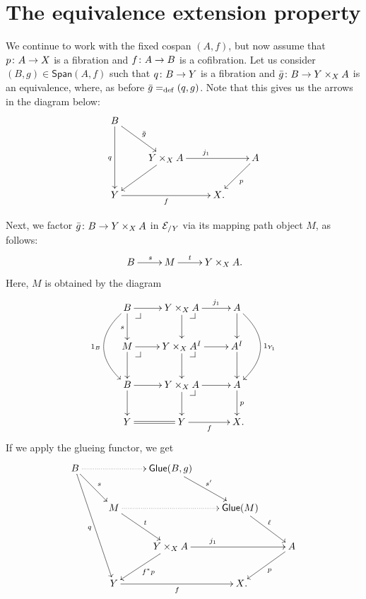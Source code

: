 \documentclass[reqno,a4paper,oneside]{amsart}
\begin{document}
\section{The equivalence extension property} 

We continue to work with the fixed cospan $(A, f)$, but now assume that $p \co A \to X$ is a fibration and 
$f \co A \to B$ is a cofibration. Let us consider $(B, g) \in \mathsf{Span}(A, f)$ such
that $q \co B \to Y$ is a fibration and $\bar{g} \co B \to Y \times_X A$ is an equivalence, where, as before $\bar{g} \defeq (q,g)$. Note that this gives us the arrows in the diagram below: 
\[
\xymatrix{
  B
  \ar[dr]^{\bar{g}}
  \ar[dd]_{q}
&&
&\\&
  Y \times_X A 
  \ar[rr]^(.45){j_1}
  \ar[dl]
&&
  A
  \ar[dl]^{p}
\\
  Y
  \ar[rr]_f
&&
  X \rlap{.} 
&
}
\]

Next, we factor $\bar{g} \co  B \to Y \times_X A$ in $\cal{E}_{/Y}$ via its mapping path object $M$, as follows:
\[
\xymatrix{ 
 B \ar[r]^{s} & M \ar[r]^-t  &  Y \times_X A \rlap{.} }
 \]
 Here, $M$ is obtained by the diagram 
 \begin{equation}
 \label{equ:def-of-mapping-path}
 \begin{gathered}
\xymatrix{
B \ar[r] \ar[d]_s \drpullback  \ar@/_2pc/[dd]_{1_B} & Y \times_X A \ar[d] \ar[r]^-{j_1} \drpullback & A \ar[d]  \ar@/^2pc/[dd]^{1_{Y_1}} \\
M \ar[r] \ar[d] \drpullback & Y \times_X {A}^I \ar[d] \ar[r] \drpullback& A^I \ar[d] \\ 
B \ar[r] \ar[d] & Y \times_X A \ar[r] \ar[d]  \drpullback & A \ar[d]^p  \\
Y \ar@{=}[r] & Y \ar[r]_f & X \rlap{.}  }
\end{gathered}
\end{equation}
 If we apply the glueing functor, we get 
\[
\xymatrix{
  B \ar[dr]^{s} \ar@{.>}[rr] 
  \ar[dddr]_{q} & & \mathsf{Glue}(B,g) \ar[dr]^{s'} & & \\
& M \ar[dr]^t \ar@{.>}[rr] & & \mathsf{Glue}(M) \ar[dr]^{\ell}
& \\& & 
  Y \times_X A 
  \ar[rr]^(.35){j_1}
  \ar[dl]^{f^* p}
&&
  A
  \ar[dl]^{p}
\\
&   Y
  \ar[rr]_f
&&
  X \rlap{.} 
&
}
\]
 
\end{document}
